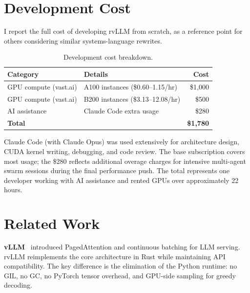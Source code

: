 \documentclass[11pt,a4paper]{article}
\newcommand{\thead}[1]{\textbf{\color{white}#1}}
\begin{document}
\section{Development Cost}
\label{sec:cost}

I report the full cost of developing rvLLM from scratch, as a reference point
for others considering similar systems-language rewrites.

\begin{table}[h]
  \centering
  \caption{Development cost breakdown.}
  \label{tab:cost}
  \small
  \begin{tabular}{@{}llr@{}}
    \toprule
    \rowcolor{HeaderBlue} \thead{Category} & \thead{Details} & \thead{Cost} \\
    \midrule
    GPU compute (vast.ai) & A100 instances (\$0.60--1.15/hr) & \$1{,}000 \\
    \rowcolor{gray!8}
    GPU compute (vast.ai) & B200 instances (\$3.13--12.08/hr) & \$500 \\
    AI assistance         & Claude Code extra usage & \$280 \\
    \midrule
    \rowcolor{gray!8}
    \textbf{Total}        &                         & \textbf{\$1{,}780} \\
    \bottomrule
  \end{tabular}
\end{table}

Claude Code (with Claude Opus) was used extensively for architecture design, CUDA
kernel writing, debugging, and code review. The base subscription covers most usage;
the \$280 reflects additional overage charges for intensive multi-agent swarm sessions
during the final performance push. The total represents one developer working with
AI assistance and rented GPUs over approximately 22 hours.

\section{Related Work}
\label{sec:related}

\textbf{vLLM}~\cite{kwon2023vllm} introduced PagedAttention and continuous batching
for LLM serving. rvLLM reimplements the core architecture in Rust while maintaining
API compatibility. The key difference is the elimination of the Python runtime:
no GIL, no GC, no PyTorch tensor overhead, and GPU-side sampling for greedy decoding.
\end{document}
